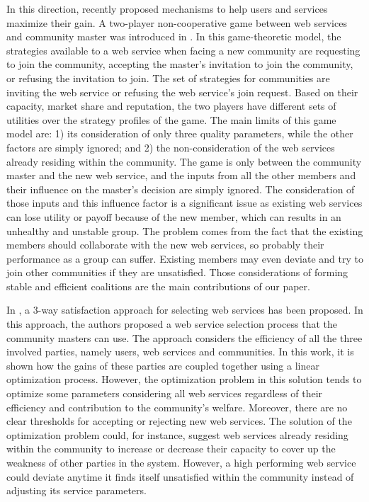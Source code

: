 \documentclass[10pt,journal,cspaper,compsoc]{IEEEtran}
\begin{document}
In this direction, recently \cite{DBLP:conf/IEEEscc/LimTMB12,
DBLP:conf/IEEEscc/KhosravifarABT11, 10.1109/TSC.2012.12} proposed
mechanisms to help users and services maximize their gain. A
two-player non-cooperative game between web services and community
master was introduced in
\cite{DBLP:conf/IEEEscc/KhosravifarABT11}. In this game-theoretic
model, the strategies available to a web service when facing a new
community are requesting to join the community, accepting the
master's invitation to join the community, or refusing the
invitation to join. The set of strategies for communities are
inviting the web service or refusing the web service's join
request. Based on their capacity, market share and reputation, the
two players have different sets of utilities over the strategy
profiles of the game. The main limits of this game model are: 1)
its consideration of only three quality parameters, while the
other factors are simply ignored; and 2) the non-consideration of
the web services already residing within the community. The game
is only between the community master and the new web service, and
the inputs from all the other members and their influence on the
master's decision are simply ignored. The consideration of those
inputs and this influence factor is a significant issue as
existing web services can lose utility or payoff because of the
new member, which can results in an unhealthy and unstable group.
The problem comes from the fact that the existing members should
collaborate with the new web services, so probably their
performance as a group can suffer. Existing members may even
deviate and try to join other communities if they are unsatisfied.
Those considerations of forming stable and efficient coalitions
are the main contributions of our paper.

In \cite{DBLP:conf/IEEEscc/LimTMB12}, a 3-way satisfaction approach
for selecting web services has been proposed. In this approach,
the authors proposed a web service selection process that the
community masters can use. The approach considers the efficiency
of all the three involved parties, namely users, web services and
communities. In this work, it is shown how the gains of these
parties are coupled together using a linear optimization process.
However, the optimization problem in this solution tends to
optimize some parameters considering all web services regardless
of their efficiency and contribution to the community's welfare.
Moreover, there are no clear thresholds for accepting or rejecting
new web services. The solution of the optimization problem could,
for instance, suggest web services already residing within the
community to increase or decrease their capacity to cover up the
weakness of other parties in the system. However, a high
performing web service could deviate anytime it finds itself
unsatisfied within the community instead of adjusting its service
parameters.
\end{document}
